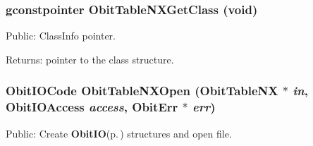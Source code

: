 \subsubsection{\setlength{\rightskip}{0pt plus 5cm}gconstpointer Obit\-Table\-NXGet\-Class (void)}\label{ObitTableNX_8h_a13}


Public: Class\-Info pointer. 

\begin{Desc}
\item[Returns:]pointer to the class structure. \end{Desc}
\subsubsection{\setlength{\rightskip}{0pt plus 5cm}Obit\-IOCode Obit\-Table\-NXOpen ({\bf Obit\-Table\-NX} $\ast$ {\em in}, Obit\-IOAccess {\em access}, {\bf Obit\-Err} $\ast$ {\em err})}\label{ObitTableNX_8h_a17}


Public: Create {\bf Obit\-IO}{\rm (p.\,\pageref{structObitIO})} structures and open file. 

